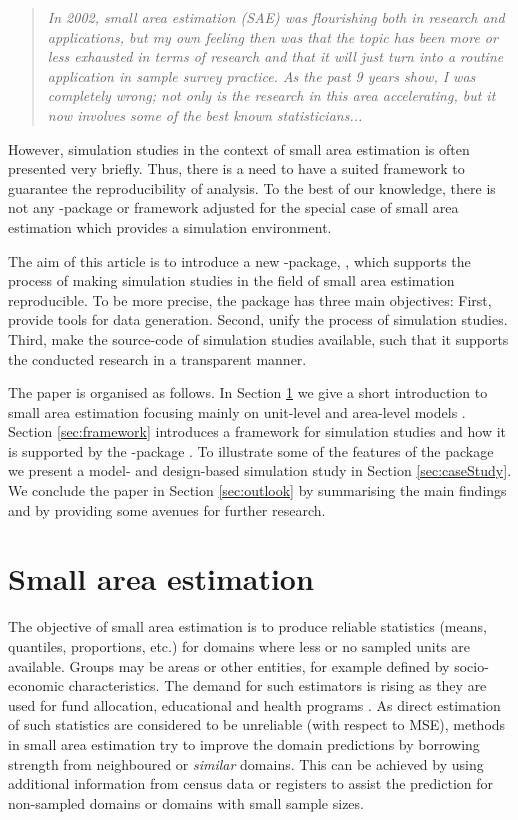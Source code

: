 \documentclass[article]{ajs}
\begin{document}
\begin{quote}
\textit{In 2002, small area estimation (SAE) was flourishing both in research and applications, but my own feeling then was that the topic has been more or less exhausted in terms of research and that it will just turn into a routine application in sample survey practice. As the past 9 years show, I was completely wrong; not only is the research in this area accelerating, but it now involves some of the best known statisticians...} \cite{pfeffermann13} 
\end{quote} 

However, simulation studies in the context of small area estimation is often presented very briefly. Thus, there is a need to have a suited framework to guarantee the reproducibility of analysis. To the best of our knowledge, there is not any -package or framework adjusted for the special case of small area estimation which provides a simulation environment.

The aim of this article is to introduce a new -package, , which supports the process of making simulation studies in the field of small area estimation reproducible. To be more precise, the package has three main objectives: First, provide tools for data generation. Second, unify the process of simulation studies. Third, make the source-code of simulation studies available, such that it supports the conducted research in a transparent manner.

The paper is organised as follows. In Section \ref{sec:SAE} we give a short introduction to small area estimation focusing mainly on unit-level \citep{battese88} and area-level models \citep{fay79}. Section \ref{sec:framework} introduces a framework for simulation studies and how it is supported by the  -package . To illustrate some of the features of the package we present a model- and design-based simulation study in Section \ref{sec:caseStudy}. We conclude the paper in Section \ref{sec:outlook} by summarising the main findings and by providing some avenues for further research.


\section{Small area estimation}
\label{sec:SAE}

The objective of small area estimation is to produce reliable statistics (means, quantiles, proportions, etc.) for domains where less or no sampled units are available. Groups may be areas or other entities, for example defined by socio-economic characteristics. The demand for such estimators is rising as they are used for fund allocation, educational and health programs \citep{pfeffermann13}. As direct estimation of such statistics are considered to be unreliable (with respect to MSE), methods in small area estimation try to improve the domain predictions by borrowing strength from neighboured or \textit{similar} domains. This can be achieved by using additional information from census data or registers to assist the prediction for non-sampled domains or domains with small sample sizes. 
\end{document}
